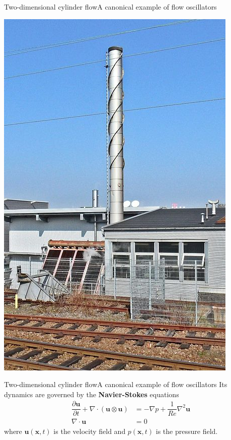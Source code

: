 \documentclass[usenames,dvipsnames,svgnames,10pt,aspectratio=169]{beamer}
\begin{document}
\begin{frame}[t, c]{Two-dimensional cylinder flow}{A canonical example of flow oscillators}
\begin{minipage}{.48\textwidth}
    \includegraphics[height=.75\textheight]{cheminee}
  \end{minipage}
\end{frame}





\begin{frame}[t, c]{Two-dimensional cylinder flow}{A canonical example of flow oscillators}
  Its dynamics are governed by the \alert{\textbf{Navier-Stokes}} equations
  \[
  \begin{aligned}
    \dfrac{\partial \bm{u}}{\partial t} + \nabla \cdot \left( \bm{u} \otimes \bm{u} \right) & = -\nabla p + \dfrac{1}{Re} \nabla^2 \bm{u} \\
    \nabla \cdot \bm{u} & = 0
  \end{aligned}
  \]
  where $\bm{u}(\bm{x}, t)$ is the velocity field and $p(\bm{x}, t)$ is the pressure field.
\end{frame}
\end{document}
